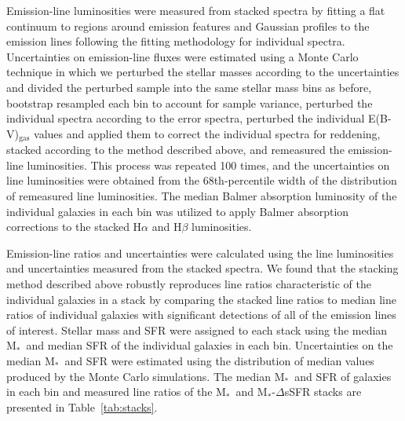 \documentclass[iop,twocolappendix]{emulateapj}
\newcommand{\mstar}{$\mbox{M}_*$}
\begin{document}
Emission-line luminosities were measured from stacked spectra by fitting a flat continuum to regions
 around emission features and Gaussian profiles to the emission lines following the fitting
 methodology for individual spectra.  Uncertainties on emission-line fluxes were estimated
 using a Monte Carlo technique in which we perturbed the stellar masses according to the
 uncertainties and divided the perturbed sample into
 the same stellar mass bins as before, bootstrap resampled each bin to account for sample
 variance, perturbed the individual spectra according to the error spectra, perturbed the
 individual E(B-V)$_{\text{gas}}$ values and applied them to correct the individual spectra for
 reddening, stacked according to the method described above,
 and remeasured the emission-line luminosities.  This process was repeated 100 times, and the
 uncertainties on line luminosities were obtained from the 68th-percentile width of the
 distribution of remeasured line luminosities.  The median Balmer absorption luminosity of
 the individual galaxies in each bin was utilized to apply Balmer absorption corrections
 to the stacked H$\alpha$ and H$\beta$ luminosities.

Emission-line ratios and uncertainties
 were calculated using the line luminosities and uncertainties measured from the stacked spectra.
  We found that the stacking method described above
 robustly reproduces line ratios characteristic of the individual galaxies in a stack by comparing
 the stacked line ratios to median line ratios of individual galaxies with significant
 detections of all of the emission lines of interest.
  Stellar mass and SFR were assigned to each stack using the median \mstar\ and median SFR of the
 individual galaxies in each bin.  Uncertainties on the median \mstar\ and SFR were estimated using
 the distribution of median values produced by the Monte Carlo simulations.
  The median \mstar\ and SFR of galaxies in each bin and
 measured line ratios of the \mstar\ and \mstar-$\Delta$sSFR stacks are presented in Table~\ref{tab:stacks}.

\end{document}
